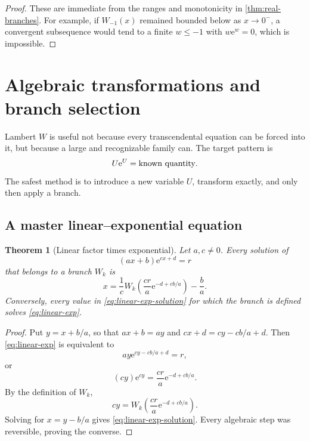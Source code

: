 \documentclass[11pt]{article}
\numberwithin{equation}{section}
\newtheorem{theorem}{Theorem}[section]
\theoremstyle{definition}
\theoremstyle{remark}
\newcommand{\e}{\mathrm e}
\begin{document}
\begin{proof}
These are immediate from the ranges and monotonicity in
\cref{thm:real-branches}.  For example, if $W_{-1}(x)$ remained bounded below
as $x\to0^-$, a convergent subsequence would tend to a finite $w\le-1$ with
$w\e^w=0$, which is impossible.
\end{proof}

\section{Algebraic transformations and branch selection}
\label{sec:algebra}

Lambert $W$ is useful not because every transcendental equation can be forced
into it, but because a large and recognizable family can.  The target pattern
is
\[
  U\e^U=\hbox{known quantity}.
\]
The safest method is to introduce a new variable $U$, transform exactly, and
only then apply a branch.

\subsection{A master linear--exponential equation}

\begin{theorem}[Linear factor times exponential]
\label{thm:linear-exponential}
Let $a,c\ne0$.  Every solution of
\begin{equation}
  (ax+b)\e^{cx+d}=r                                  \label{eq:linear-exp}
\end{equation}
that belongs to a branch $W_k$ is
\begin{equation}
  x=\frac1c W_k\!\left(\frac{cr}{a}
       \e^{-d+cb/a}\right)-\frac ba.                  \label{eq:linear-exp-solution}
\end{equation}
Conversely, every value in \eqref{eq:linear-exp-solution} for which the branch
is defined solves \eqref{eq:linear-exp}.
\end{theorem}

\begin{proof}
Put $y=x+b/a$, so that $ax+b=ay$ and
$cx+d=cy-cb/a+d$.  Then \eqref{eq:linear-exp} is equivalent to
\[
  ay\e^{cy-cb/a+d}=r,
\]
or
\[
  (cy)\e^{cy}=\frac{cr}{a}\e^{-d+cb/a}.
\]
By the definition of $W_k$,
\[
  cy=W_k\!\left(\frac{cr}{a}\e^{-d+cb/a}\right).
\]
Solving for $x=y-b/a$ gives \eqref{eq:linear-exp-solution}.  Every algebraic
step was reversible, proving the converse.
\end{proof}
\end{document}
